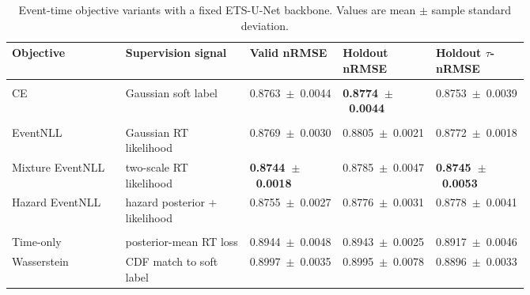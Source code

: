 \documentclass[12pt]{article}
\begin{document}
\begin{table}[!t]
\centering
\caption{Event-time objective variants with a fixed ETS-U-Net backbone. Values are mean $\pm$ sample standard deviation.}
\label{tab:r11_segmentation_losses}
\footnotesize
\setlength{\tabcolsep}{2pt}
\renewcommand{\arraystretch}{1.15}
\begin{tabularx}{\linewidth}{@{} >{\RaggedRight\arraybackslash}p{0.22\linewidth} Y >{\centering\arraybackslash}p{0.18\linewidth} >{\centering\arraybackslash}p{0.18\linewidth} >{\centering\arraybackslash}p{0.18\linewidth} @{}}
\toprule
\textbf{Objective} & \textbf{Supervision signal} & \textbf{Valid nRMSE} & \textbf{Holdout nRMSE} & \textbf{Holdout \(\tau\)-nRMSE} \\
\midrule
{} \\
\addlinespace[0.15em]
CE & Gaussian soft label & \mbox{0.8763 $\pm$ 0.0044} & \textbf{\mbox{0.8774 $\pm$ 0.0044}} & \mbox{0.8753 $\pm$ 0.0039} \\
\midrule
{} \\
\addlinespace[0.15em]
EventNLL & Gaussian RT \mbox{likelihood} & \mbox{0.8769 $\pm$ 0.0030} & \mbox{0.8805 $\pm$ 0.0021} & \mbox{0.8772 $\pm$ 0.0018} \\
Mixture EventNLL & two-scale RT \mbox{likelihood} & \textbf{\mbox{0.8744 $\pm$ 0.0018}} & \mbox{0.8785 $\pm$ 0.0047} & \textbf{\mbox{0.8745 $\pm$ 0.0053}} \\
Hazard EventNLL & hazard posterior + \mbox{likelihood} & \mbox{0.8755 $\pm$ 0.0027} & \mbox{0.8776 $\pm$ 0.0031} & \mbox{0.8778 $\pm$ 0.0041} \\
\midrule
{} \\
\addlinespace[0.15em]
Time-only & posterior-mean RT loss & \mbox{0.8944 $\pm$ 0.0048} & \mbox{0.8943 $\pm$ 0.0025} & \mbox{0.8917 $\pm$ 0.0046} \\
Wasserstein & CDF match to soft label & \mbox{0.8997 $\pm$ 0.0035} & \mbox{0.8995 $\pm$ 0.0078} & \mbox{0.8896 $\pm$ 0.0033} \\
\bottomrule
\end{tabularx}
\end{table}
\end{document}
